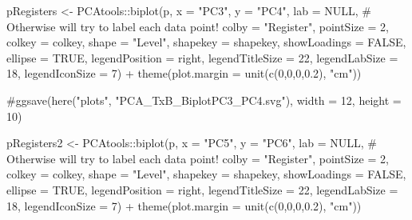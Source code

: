\documentclass[
  letterpaper,
  DIV=11,
  numbers=noendperiod]{scrreprt}
\newenvironment{Shaded}{\begin{snugshade}}{\end{snugshade}}
\newcommand{\AttributeTok}[1]{\textcolor[rgb]{0.40,0.45,0.13}{#1}}
\newcommand{\CommentTok}[1]{\textcolor[rgb]{0.37,0.37,0.37}{#1}}
\newcommand{\ConstantTok}[1]{\textcolor[rgb]{0.56,0.35,0.01}{#1}}
\newcommand{\DecValTok}[1]{\textcolor[rgb]{0.68,0.00,0.00}{#1}}
\newcommand{\FloatTok}[1]{\textcolor[rgb]{0.68,0.00,0.00}{#1}}
\newcommand{\FunctionTok}[1]{\textcolor[rgb]{0.28,0.35,0.67}{#1}}
\newcommand{\NormalTok}[1]{\textcolor[rgb]{0.00,0.23,0.31}{#1}}
\newcommand{\OtherTok}[1]{\textcolor[rgb]{0.00,0.23,0.31}{#1}}
\newcommand{\SpecialCharTok}[1]{\textcolor[rgb]{0.37,0.37,0.37}{#1}}
\newcommand{\StringTok}[1]{\textcolor[rgb]{0.13,0.47,0.30}{#1}}
\begin{document}
\begin{Shaded}
\begin{Highlighting}[]
\NormalTok{pRegisters }\OtherTok{\textless{}{-}}\NormalTok{ PCAtools}\SpecialCharTok{::}\FunctionTok{biplot}\NormalTok{(p,}
                 \AttributeTok{x =} \StringTok{"PC3"}\NormalTok{,}
                 \AttributeTok{y =} \StringTok{"PC4"}\NormalTok{,}
                 \AttributeTok{lab =} \ConstantTok{NULL}\NormalTok{, }\CommentTok{\# Otherwise will try to label each data point!}
                 \AttributeTok{colby =} \StringTok{"Register"}\NormalTok{,}
                 \AttributeTok{pointSize =} \DecValTok{2}\NormalTok{,}
                 \AttributeTok{colkey =}\NormalTok{ colkey,}
                 \AttributeTok{shape =} \StringTok{"Level"}\NormalTok{,}
                 \AttributeTok{shapekey =}\NormalTok{ shapekey,}
                 \AttributeTok{showLoadings =} \ConstantTok{FALSE}\NormalTok{,}
                 \AttributeTok{ellipse =} \ConstantTok{TRUE}\NormalTok{,}
                 \AttributeTok{legendPosition =} \StringTok{\textquotesingle{}right\textquotesingle{}}\NormalTok{,}
                 \AttributeTok{legendTitleSize =} \DecValTok{22}\NormalTok{,}
                 \AttributeTok{legendLabSize =} \DecValTok{18}\NormalTok{, }
                 \AttributeTok{legendIconSize =} \DecValTok{7}\NormalTok{) }\SpecialCharTok{+}
  \FunctionTok{theme}\NormalTok{(}\AttributeTok{plot.margin =} \FunctionTok{unit}\NormalTok{(}\FunctionTok{c}\NormalTok{(}\DecValTok{0}\NormalTok{,}\DecValTok{0}\NormalTok{,}\DecValTok{0}\NormalTok{,}\FloatTok{0.2}\NormalTok{), }\StringTok{"cm"}\NormalTok{))}

\CommentTok{\#ggsave(here("plots", "PCA\_TxB\_BiplotPC3\_PC4.svg"), width = 12, height = 10)}

\NormalTok{pRegisters2 }\OtherTok{\textless{}{-}}\NormalTok{ PCAtools}\SpecialCharTok{::}\FunctionTok{biplot}\NormalTok{(p,}
                 \AttributeTok{x =} \StringTok{"PC5"}\NormalTok{,}
                 \AttributeTok{y =} \StringTok{"PC6"}\NormalTok{,}
                 \AttributeTok{lab =} \ConstantTok{NULL}\NormalTok{, }\CommentTok{\# Otherwise will try to label each data point!}
                 \AttributeTok{colby =} \StringTok{"Register"}\NormalTok{,}
                 \AttributeTok{pointSize =} \DecValTok{2}\NormalTok{,}
                 \AttributeTok{colkey =}\NormalTok{ colkey,}
                 \AttributeTok{shape =} \StringTok{"Level"}\NormalTok{,}
                 \AttributeTok{shapekey =}\NormalTok{ shapekey,}
                 \AttributeTok{showLoadings =} \ConstantTok{FALSE}\NormalTok{,}
                 \AttributeTok{ellipse =} \ConstantTok{TRUE}\NormalTok{,}
                 \AttributeTok{legendPosition =} \StringTok{\textquotesingle{}right\textquotesingle{}}\NormalTok{,}
                 \AttributeTok{legendTitleSize =} \DecValTok{22}\NormalTok{,}
                 \AttributeTok{legendLabSize =} \DecValTok{18}\NormalTok{, }
                 \AttributeTok{legendIconSize =} \DecValTok{7}\NormalTok{) }\SpecialCharTok{+}
  \FunctionTok{theme}\NormalTok{(}\AttributeTok{plot.margin =} \FunctionTok{unit}\NormalTok{(}\FunctionTok{c}\NormalTok{(}\DecValTok{0}\NormalTok{,}\DecValTok{0}\NormalTok{,}\DecValTok{0}\NormalTok{,}\FloatTok{0.2}\NormalTok{), }\StringTok{"cm"}\NormalTok{))}


\end{Highlighting}
\end{Shaded}
\end{document}
